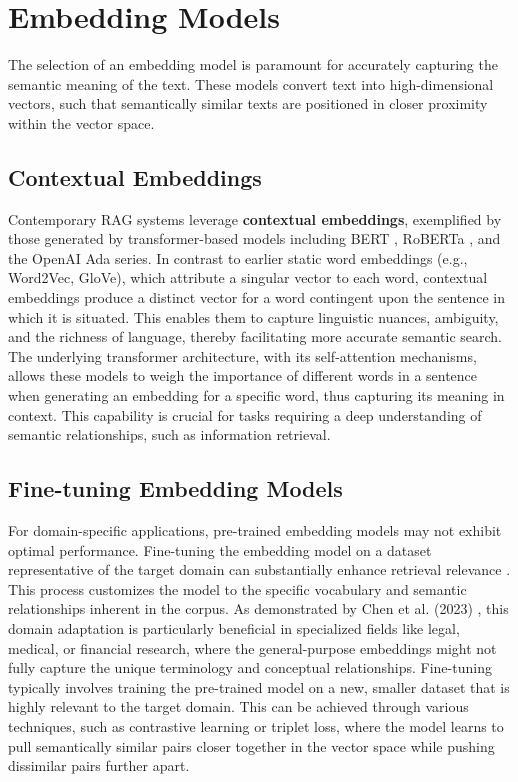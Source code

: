 \section{Embedding Models}
The selection of an embedding model is paramount for accurately capturing the semantic meaning of the text. These models convert text into high-dimensional vectors, such that semantically similar texts are positioned in closer proximity within the vector space.

\subsection{Contextual Embeddings}
Contemporary RAG systems leverage \textbf{contextual embeddings}, exemplified by those generated by transformer-based models including BERT \autocite{devlin2019bert}, RoBERTa \autocite{liu2019roberta}, and the OpenAI Ada series. In contrast to earlier static word embeddings (e.g., Word2Vec, GloVe), which attribute a singular vector to each word, contextual embeddings produce a distinct vector for a word contingent upon the sentence in which it is situated. This enables them to capture linguistic nuances, ambiguity, and the richness of language, thereby facilitating more accurate semantic search. The underlying transformer architecture, with its self-attention mechanisms, allows these models to weigh the importance of different words in a sentence when generating an embedding for a specific word, thus capturing its meaning in context. This capability is crucial for tasks requiring a deep understanding of semantic relationships, such as information retrieval.

\subsection{Fine-tuning Embedding Models}
For domain-specific applications, pre-trained embedding models may not exhibit optimal performance. Fine-tuning the embedding model on a dataset representative of the target domain can substantially enhance retrieval relevance \autocite{chen2023improving}. This process customizes the model to the specific vocabulary and semantic relationships inherent in the corpus. As demonstrated by Chen et al. (2023) \autocite{chen2023improving}, this domain adaptation is particularly beneficial in specialized fields like legal, medical, or financial research, where the general-purpose embeddings might not fully capture the unique terminology and conceptual relationships. Fine-tuning typically involves training the pre-trained model on a new, smaller dataset that is highly relevant to the target domain. This can be achieved through various techniques, such as contrastive learning or triplet loss, where the model learns to pull semantically similar pairs closer together in the vector space while pushing dissimilar pairs further apart.

